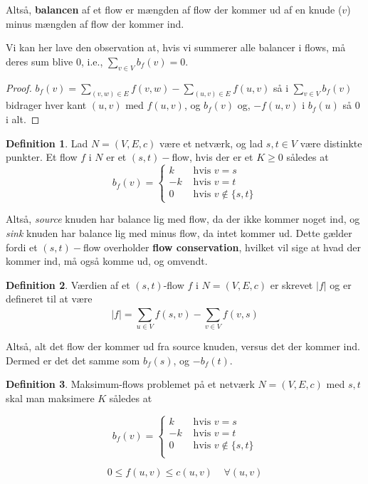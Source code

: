 \documentclass[11pt]{article}
\theoremstyle{definition}
\newtheorem{definition}{Definition}
\theoremstyle{remark}
\begin{document}
Altså, \textbf{balancen} af et flow er mængden af flow der kommer ud af en knude ($v$) minus mængden af flow der kommer ind. 


Vi kan her lave den observation at, hvis vi summerer alle balancer i flows, må deres sum blive 0, i.e., $\sum_{v \in V}^{} b_{f}(v) = 0$.

\begin{proof}
  $b_{f}(v) = \sum_{(v,w) \in E}^{}f(v,w) - \sum_{(u,v) \in E}^{}f(u,v)$
  så i $\sum_{v \in V}^{}b_{f}(v)$ bidrager hver kant $(u,v)$ med $f(u,v)$, og $b_{f}(v)$ og, $-f(u,v)$ i $b_{f}(u)$ så 0 i alt.
\end{proof}

\begin{definition}
  Lad $N = (V,E,c)$  være et netværk, og lad $s, t \in V$ være distinkte punkter. Et flow $f$ i $N$ er et $(s,t)-$flow, hvis der er et $K \geq 0$ således at
  \[
    b_{f}(v) =
    \begin{cases}
      k & \text{ hvis } v = s \\
      -k & \text{ hvis } v = t\\
      0 & \text{ hvis } v \notin \{s, t\}
    \end{cases}
    \]
\end{definition}

Altså, \textit{source} knuden har balance lig med flow, da der ikke kommer noget ind, og \textit{sink} knuden har balance lig med minus flow, da intet kommer ud. Dette gælder fordi et $(s,t)-$flow overholder \textbf{flow conservation}, hvilket vil sige at hvad der kommer ind, må også komme ud, og omvendt. 

\begin{definition}
  Værdien af et $(s,t)$-flow $f$ i $N = (V,E,c)$ er skrevet $|f|$ og er defineret til at være
  \[
|f| = \sum_{u \in V}^{}f(s,v) - \sum_{v \in V}^{} f(v,s)
  \]
\end{definition}

Altså, alt det flow der kommer ud fra source knuden, versus det der kommer ind.  Dermed er det det samme som $b_{f}(s)$, og $-b_{f}(t)$.

\begin{definition}
  Maksimum-flows problemet på et netværk $N = (V,E,c)$ med $s,t$ skal man maksimere $K$ således at

  \[
b_{f}(v) = \begin{cases}
  k & \text{ hvis } v = s\\
  -k & \text{ hvis } v = t\\
  0 & \text{ hvis } v \notin \{s,t\}\\
\end{cases}
    \]

    \[
0 \leq f(u,v) \leq c(u,v) \;\;\;\; \forall (u,v)
    \]
\end{definition}
\end{document}
